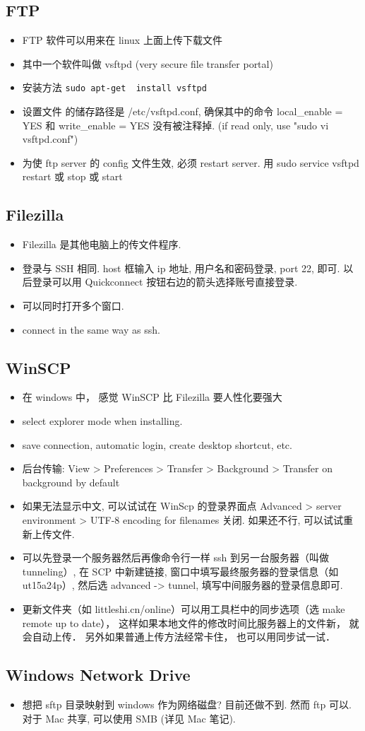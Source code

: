 
\subsection{FTP}
\begin{itemize}
\item FTP 软件可以用来在 linux 上面上传下载文件
\item 其中一个软件叫做 vsftpd (very secure file transfer portal)
\item 安装方法 \verb`sudo apt-get  install vsftpd`
\item 设置文件 的储存路径是 /etc/vsftpd.conf, 确保其中的命令 local_enable = YES 和 write_enable = YES  没有被注释掉.
(if read only, use "sudo vi vsftpd.conf")
\item 为使 ftp server 的 config 文件生效, 必须 restart server. 用 sudo service vsftpd restart 或 stop 或 start
\end{itemize}

\subsection{Filezilla}
\begin{itemize}
\item Filezilla 是其他电脑上的传文件程序.
\item 登录与 SSH 相同. host 框输入 ip 地址, 用户名和密码登录, port 22, 即可. 以后登录可以用 Quickconnect 按钮右边的箭头选择账号直接登录.
\item 可以同时打开多个窗口.
\item connect in the same way as ssh.
\end{itemize}

\subsection{WinSCP}
\begin{itemize}
\item 在 windows 中， 感觉 WinSCP 比 Filezilla 要人性化要强大
\item select explorer mode when installing.
\item save connection, automatic login, create desktop shortcut, etc.
\item 后台传输: View > Preferences > Transfer > Background > Transfer on background by default
\item 如果无法显示中文, 可以试试在 WinScp 的登录界面点 Advanced > server environment > UTF-8 encoding for filenames 关闭. 如果还不行, 可以试试重新上传文件.
\item 可以先登录一个服务器然后再像命令行一样 ssh 到另一台服务器（叫做 tunneling）, 在 SCP 中新建链接, 窗口中填写最终服务器的登录信息（如 ut15a24p）, 然后选 advanced -> tunnel, 填写中间服务器的登录信息即可.
\item 更新文件夹（如 littleshi.cn/online）可以用工具栏中的同步选项（选 make remote up to date）， 这样如果本地文件的修改时间比服务器上的文件新， 就会自动上传． 另外如果普通上传方法经常卡住， 也可以用同步试一试．
\end{itemize}

\subsection{Windows Network Drive}
\begin{itemize}
\item 想把 sftp 目录映射到 windows 作为网络磁盘? 目前还做不到. 然而 ftp 可以. 对于 Mac 共享, 可以使用 SMB (详见 Mac 笔记).
\end{itemize}
